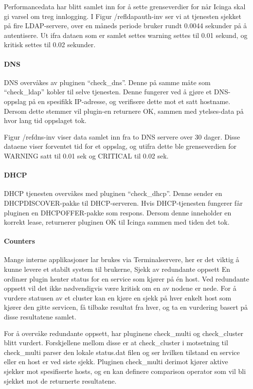 Performancedata har blitt samlet inn for å sette grenseverdier for når Icinga skal gi varsel om treg innlogging. I Figur /ref{ldapauth-inv} ser vi at tjenesten sjekket på fire LDAP-servere, over en måneds periode bruker rundt 0.0044 sekunder på å autentisere. Ut ifra dataen som er samlet settes warning settes til 0.01 sekund, og kritisk settes til 0.02 sekunder.

\paragraph{DNS}

DNS overvåkes av pluginen “check\_dns”. Denne på samme måte som “check\_ldap” kobler til selve tjenesten. Denne fungerer ved å gjøre et DNS-oppslag på en spesifikk IP-adresse, og verifisere dette mot et satt hostname. Dersom dette stemmer vil plugin-en returnere OK, sammen med ytelses-data på hvor lang tid oppslaget tok.

Figur /ref{dns-inv} viser data samlet inn fra to DNS servere over 30 dager. Disse dataene viser forventet tid for et oppslag, og utifra dette ble grenseverdien for WARNING satt til 0.01 sek og CRITICAL til 0.02 sek.

\paragraph{DHCP}

DHCP tjenesten overvåkes med pluginen “check\_dhcp”. Denne sender en DHCPDISCOVER-pakke til DHCP-serveren. Hvis DHCP-tjenesten fungerer får pluginen en DHCPOFFER-pakke som respons. Dersom denne inneholder en korrekt lease, returnerer pluginen OK til Icinga sammen med tiden det tok.

\paragraph{Counters}
Mange interne applikasjoner lar brukes via Terminalservere, her er det viktig å kunne levere et stabilt system til brukerne, 
Sjekk av redundante oppsett
En ordinær plugin henter status for en service som kjører på én host. Ved redundante oppsett vil det ikke nødvendigvis være kritisk om en av nodene er nede. For å vurdere statusen av et cluster kan en kjøre en sjekk på hver enkelt host som kjører den gitte servicen, få tilbake resultat fra hver, og ta en vurdering basert på disse resultatene samlet.

For å overvåke redundante oppsett, har pluginene check\_multi og check\_cluster blitt vurdert.  Forskjellene mellom disse er at check\_cluster i motsetning til check\_multi parser den lokale status.dat filen og ser hvilken tilstand en service eller en host er ved siste sjekk. Pluginen check\_multi derimot kjører aktive sjekker mot spesifiserte hosts, og en kan definere comparison operator som vil bli sjekket mot de returnerte resultatene.

